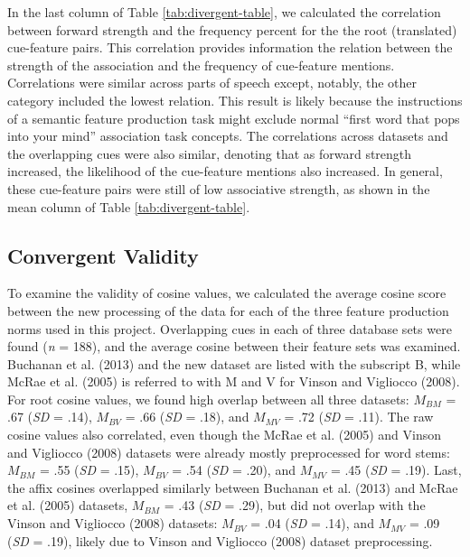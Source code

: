 \documentclass[english,,man]{apa6}
\theoremstyle{definition}
\theoremstyle{definition}
\theoremstyle{definition}
\theoremstyle{remark}
\begin{document}
In the last column of Table \ref{tab:divergent-table}, we calculated the
correlation between forward strength and the frequency percent for the
the root (translated) cue-feature pairs. This correlation provides
information the relation between the strength of the association and the
frequency of cue-feature mentions. Correlations were similar across
parts of speech except, notably, the other category included the lowest
relation. This result is likely because the instructions of a semantic
feature production task might exclude normal \enquote{first word that
pops into your mind} association task concepts. The correlations across
datasets and the overlapping cues were also similar, denoting that as
forward strength increased, the likelihood of the cue-feature mentions
also increased. In general, these cue-feature pairs were still of low
associative strength, as shown in the mean column of Table
\ref{tab:divergent-table}.

\hypertarget{convergent-validity}{%
\subsection{Convergent Validity}\label{convergent-validity}}

To examine the validity of cosine values, we calculated the average
cosine score between the new processing of the data for each of the
three feature production norms used in this project. Overlapping cues in
each of three database sets were found (\emph{n} = 188), and the average
cosine between their feature sets was examined. Buchanan et al. (2013)
and the new dataset are listed with the subscript B, while McRae et al.
(2005) is referred to with M and V for Vinson and Vigliocco (2008). For
root cosine values, we found high overlap between all three datasets:
\(M_{BM}\) = .67 (\emph{SD} = .14), \(M_{BV}\) = .66 (\emph{SD} = .18),
and \(M_{MV}\) = .72 (\emph{SD} = .11). The raw cosine values also
correlated, even though the McRae et al. (2005) and Vinson and Vigliocco
(2008) datasets were already mostly preprocessed for word stems:
\(M_{BM}\) = .55 (\emph{SD} = .15), \(M_{BV}\) = .54 (\emph{SD} = .20),
and \(M_{MV}\) = .45 (\emph{SD} = .19). Last, the affix cosines
overlapped similarly between Buchanan et al. (2013) and McRae et al.
(2005) datasets, \(M_{BM}\) = .43 (\emph{SD} = .29), but did not overlap
with the Vinson and Vigliocco (2008) datasets: \(M_{BV}\) = .04
(\emph{SD} = .14), and \(M_{MV}\) = .09 (\emph{SD} = .19), likely due to
Vinson and Vigliocco (2008) dataset preprocessing.
\end{document}
